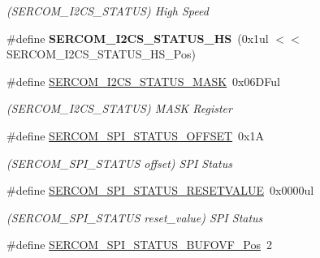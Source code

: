 \begin{DoxyCompactItemize}
\begin{DoxyCompactList}\small\item\em (S\+E\+R\+C\+O\+M\+\_\+\+I2\+C\+S\+\_\+\+S\+T\+A\+T\+U\+S) High Speed \end{DoxyCompactList}\item 
\hypertarget{group___s_a_m_l21___s_e_r_c_o_m_gae0212247168ea9762e9b3fa7035fcc0d}{}\#define {\bfseries S\+E\+R\+C\+O\+M\+\_\+\+I2\+C\+S\+\_\+\+S\+T\+A\+T\+U\+S\+\_\+\+H\+S}~(0x1ul $<$$<$ S\+E\+R\+C\+O\+M\+\_\+\+I2\+C\+S\+\_\+\+S\+T\+A\+T\+U\+S\+\_\+\+H\+S\+\_\+\+Pos)\label{group___s_a_m_l21___s_e_r_c_o_m_gae0212247168ea9762e9b3fa7035fcc0d}

\item 
\hypertarget{group___s_a_m_l21___s_e_r_c_o_m_ga7bd35aa131b258489a1a6c2512d8ea98}{}\#define \hyperlink{group___s_a_m_l21___s_e_r_c_o_m_ga7bd35aa131b258489a1a6c2512d8ea98}{S\+E\+R\+C\+O\+M\+\_\+\+I2\+C\+S\+\_\+\+S\+T\+A\+T\+U\+S\+\_\+\+M\+A\+S\+K}~0x06\+D\+Ful\label{group___s_a_m_l21___s_e_r_c_o_m_ga7bd35aa131b258489a1a6c2512d8ea98}

\begin{DoxyCompactList}\small\item\em (S\+E\+R\+C\+O\+M\+\_\+\+I2\+C\+S\+\_\+\+S\+T\+A\+T\+U\+S) M\+A\+S\+K Register \end{DoxyCompactList}\item 
\hypertarget{group___s_a_m_l21___s_e_r_c_o_m_ga458489d6dcf389896eab9132b1e4f7af}{}\#define \hyperlink{group___s_a_m_l21___s_e_r_c_o_m_ga458489d6dcf389896eab9132b1e4f7af}{S\+E\+R\+C\+O\+M\+\_\+\+S\+P\+I\+\_\+\+S\+T\+A\+T\+U\+S\+\_\+\+O\+F\+F\+S\+E\+T}~0x1\+A\label{group___s_a_m_l21___s_e_r_c_o_m_ga458489d6dcf389896eab9132b1e4f7af}

\begin{DoxyCompactList}\small\item\em (S\+E\+R\+C\+O\+M\+\_\+\+S\+P\+I\+\_\+\+S\+T\+A\+T\+U\+S offset) S\+P\+I Status \end{DoxyCompactList}\item 
\hypertarget{group___s_a_m_l21___s_e_r_c_o_m_ga265b7a803efc193e07756a55450dc3f0}{}\#define \hyperlink{group___s_a_m_l21___s_e_r_c_o_m_ga265b7a803efc193e07756a55450dc3f0}{S\+E\+R\+C\+O\+M\+\_\+\+S\+P\+I\+\_\+\+S\+T\+A\+T\+U\+S\+\_\+\+R\+E\+S\+E\+T\+V\+A\+L\+U\+E}~0x0000ul\label{group___s_a_m_l21___s_e_r_c_o_m_ga265b7a803efc193e07756a55450dc3f0}

\begin{DoxyCompactList}\small\item\em (S\+E\+R\+C\+O\+M\+\_\+\+S\+P\+I\+\_\+\+S\+T\+A\+T\+U\+S reset\+\_\+value) S\+P\+I Status \end{DoxyCompactList}\item 
\hypertarget{group___s_a_m_l21___s_e_r_c_o_m_ga2309438799f876054076324234bd56b5}{}\#define \hyperlink{group___s_a_m_l21___s_e_r_c_o_m_ga2309438799f876054076324234bd56b5}{S\+E\+R\+C\+O\+M\+\_\+\+S\+P\+I\+\_\+\+S\+T\+A\+T\+U\+S\+\_\+\+B\+U\+F\+O\+V\+F\+\_\+\+Pos}~2\label{group___s_a_m_l21___s_e_r_c_o_m_ga2309438799f876054076324234bd56b5}


\end{DoxyCompactItemize}
